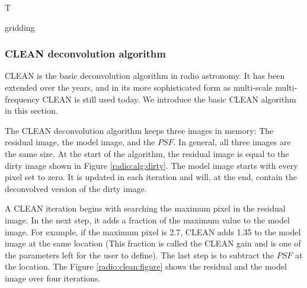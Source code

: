 T

gridding




\subsubsection{CLEAN deconvolution algorithm} \label{intro2:CLEAN}
CLEAN\cite{hogbom1974aperture} is the basic deconvolution algorithm in radio astronomy. It has been extended over the years, and in its more sophisticated form as multi-scale multi-frequency CLEAN \cite{offringa2017optimized} is still used today. We introduce the basic CLEAN algorithm in this section.

The CLEAN deconvolution algorithm keeps three images in memory: The residual image, the model image, and the $PSF$. In general, all three images are the same size. At the start of the algorithm, the residual image is equal to the dirty image shown in Figure \ref{radio:alg:dirty}. The model image starts with every pixel set to zero. It is updated in each iteration and will, at the end, contain the deconvolved version of the dirty image.

A CLEAN iteration begins with searching the maximum pixel in the residual image. In the next step, it adds a fraction of the maximum value to the model image. For example, if the maximum pixel is 2.7, CLEAN adds 1.35 to the model image at the same location (This fraction is called the CLEAN gain and is one of the parameters left for the user to define). The last step is to subtract the $PSF$ at the location. The Figure \ref{radio:clean:figure} shows the residual and the model image over four iterations.

